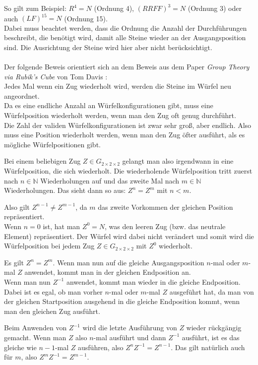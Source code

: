 \documentclass[12pt,a4paper, usenames, dvipsnames]{article}
\newcommand{\Gtwo}{\ensuremath{G_{2\times 2\times 2}}}
\begin{document}
So gilt zum Beispiel: ${R^4= N}$ (Ordnung 4), ${(RRFF)^3 = N}$ (Ordnung 3) oder auch ${(LF)^{15}=N}$ (Ordnung 15).\\ Dabei muss beachtet werden, dass die Ordnung die Anzahl der Durchführungen beschreibt, die benötigt wird, damit alle Steine wieder an der Ausgangsposition sind. Die Ausrichtung der Steine wird hier aber nicht berücksichtigt. \\
\\
Der folgende Beweis orientiert sich an dem Beweis aus dem Paper \textit{Group Theory via Rubik's Cube} von Tom Davis \cite{TD}: \\
Jedes Mal wenn ein Zug wiederholt wird, werden die Steine im Würfel neu angeordnet. \\ 
Da es eine endliche Anzahl an Würfelkonfigurationen gibt, muss eine Würfelposition wiederholt werden, wenn man den Zug oft genug durchführt. \\
Die Zahl der validen Würfelkonfigurationen ist zwar sehr groß, aber endlich. Also muss eine Position wiederholt werden, wenn man den Zug öfter ausführt, als es mögliche Würfelpositionen gibt. 


Bei einem beliebigen Zug $Z \in \Gtwo$ gelangt man also irgendwann in eine Würfelposition, die sich wiederholt. Die wiederholende Würfelposition tritt zuerst nach $n \in \mathbb{N}$ Wiederholungen auf und das zweite Mal nach $m \in \mathbb{N}$ Wiederholungen. Das sieht dann so aus: $Z^n=Z^m$ mit $n < m$. 


Also gilt $Z^{n-1} \neq Z^{m-1}$, da $m$ das zweite Vorkommen der gleichen Position repräsentiert. \\
Wenn $n=0$ ist, hat man $Z^0=N$, was den leeren Zug (bzw. das neutrale Element) repräsentiert. Der Würfel wird dabei nicht verändert und somit wird die Würfelposition bei jedem Zug $Z \in \Gtwo$ mit $Z^0$ wiederholt. 


Es gilt $Z^n = Z^m$. Wenn man nun auf die gleiche Ausgangsposition $n$-mal oder $m$-mal $Z$ anwendet, kommt man in der gleichen Endposition an. \\
Wenn man nun $Z^{-1}$ anwendet, kommt man wieder in die gleiche Endposition. Dabei ist es egal, ob man vorher $n$-mal oder $m$-mal $Z$ ausgeführt hat, da man von der gleichen Startposition ausgehend in die gleiche Endposition kommt, wenn man den gleichen Zug ausführt. 


Beim Anwenden von $Z^{-1}$ wird die letzte Ausführung von $Z$ wieder rückgängig gemacht. Wenn man $Z$ also $n$-mal ausführt und dann $Z^{-1}$ ausführt, ist es das gleiche wie $n-1$-mal $Z$ ausführen, also $Z^nZ^{-1}=Z^{n-1}$. Das gilt natürlich auch für $m$, also $Z^mZ^{-1}=Z^{m-1}$.
\end{document}
